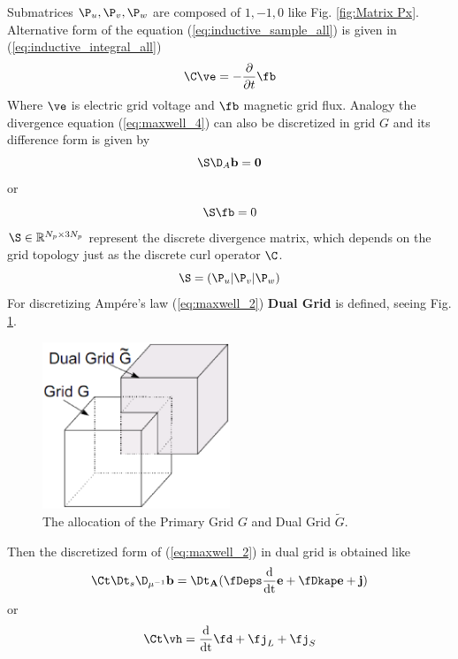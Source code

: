 Submatrices $\P_{u},\P_{v},\P_{w}$ are composed of $1,-1,0$ like Fig. \ref{fig:Matrix Px}.\\
 
Alternative form of the equation (\ref{eq:inductive_sample_all}) is given in (\ref{eq:inductive_integral_all})
\begin{equation}
\C\ve=-\frac{\partial}{\partial{t}}\fb
\label{eq:inductive_integral_all}
\end{equation}
Where $\ve$ is electric grid voltage and $\fb$ magnetic grid flux.
Analogy the divergence equation (\ref{eq:maxwell_4}) can also be discretized in grid $G$ and its difference form is given by 
\begin{equation*}
\S\D_{A}\bf{b}=0
\label{eq:divergence_sample}
\end{equation*}
or
\begin{equation*}
\S\fb=0
\label{eq:divergence_integral}
\end{equation*}
$\S\in \mathbb{R}^{N_{p}\times 3N_{p}}$ represent the discrete divergence matrix, which depends on the grid topology just as the discrete curl operator $\C$.
\begin{equation*}
\S=(\P_{u}|\P_{v}|\P_{w})
\label{eq:S_matrix}
\end{equation*}
For discretizing Amp\'ere's law (\ref{eq:maxwell_2}) \textbf{Dual Grid} is defined, seeing Fig. \ref{fig:dual_grid}. 

\begin{figure}[!ht]
\centering
\includegraphics[width=0.5\textwidth]{bilder/dual_grid}
\caption{The allocation of the Primary Grid $G$ and Dual Grid $\tilde{G}$\cite{FIT_discrete_electrommagnetism}.}
\label{fig:dual_grid}
\end{figure}
Then the discretized form of (\ref{eq:maxwell_2}) in dual grid is obtained like
\begin{equation*}
\Ct\Dt_{s}\D_{\mu^{-1}}\bf{b}=\Dt_{A}(\fDeps\frac{\mathrm{d}}{\mathrm{dt}}\bf{e}+\fDkap\bf{e}+\bf{j})
\label{eq:ampere}
\end{equation*}
or
\begin{equation*}
\Ct\vh=\frac{\mathrm{d}}{\mathrm{dt}}\fd+\fj_{L}+\fj_{S}
\label{eq:ampere_sample}
\end{equation*}


